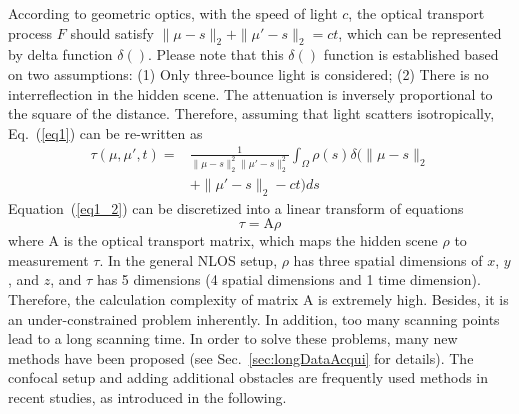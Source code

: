 According to geometric optics, with the speed of light $c$, the optical transport process $F$ should satisfy $\|\mu -s\|_{2} + \|\mu' -s\|_{2} = ct$, which can be represented by delta function $\delta()$. 
Please note that this $\delta()$ function is established based on two assumptions: (1) Only three-bounce light is considered; (2) There is no interreflection in the hidden scene.
The attenuation is inversely proportional to the square of the distance. Therefore, assuming that light scatters isotropically, Eq.~(\ref{eq1}) can be re-written as
\begin{equation}
    \begin{split}
    \tau(\mu,\mu',t) =  &\frac{1}{\|\mu -s\|_{2}^{2} \|\mu' -s\|_{2}^{2}}\int_{\Omega} \rho(s) \delta(\|\mu -s\|_{2} \\
    & + \|\mu' -s\|_{2} -ct) ds
    \label{eq1_2}
    \end{split}
\end{equation}
%
Equation~(\ref{eq1_2}) can be discretized into a linear transform of equations
\begin{equation}
    \tau = \mathrm{A} \rho
    \label{eq2}
\end{equation}
where $\mathrm{A}$ is the optical transport matrix, which maps the hidden scene $\rho$ to measurement $\tau$. In the general NLOS setup, $\rho$ has three spatial dimensions of $x$, $y$, and $z$, and $\tau$ has 5 dimensions (4 spatial dimensions and 1 time dimension). Therefore, the calculation complexity of matrix $\mathrm{A}$ is extremely high. Besides, it is an under-constrained problem inherently. In addition, too many scanning points lead to a long scanning time. In order to solve these problems, many new methods have been proposed (see Sec.~\ref{sec:longDataAcqui} for details). The confocal setup\cite{otooleConfocalNonlineofsightImaging2018} and adding additional obstacles\cite{thrampoulidisExploitingOcclusionNonLineofSight2018,heideNonlineofsightImagingPartial2017} are frequently used methods in recent studies, as introduced in the following.

